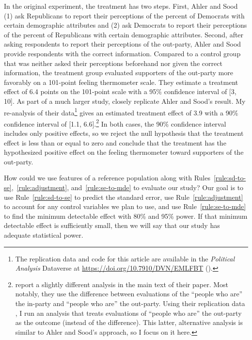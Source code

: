 \documentclass[12pt]{article}
\begin{document}
In the original experiment, the treatment has two steps.
First, Ahler and Sood (1) ask Republicans to report their perceptions of the percent of Democrats with certain demographic attributes and (2) ask Democrats to report their perceptions of the percent of Republicans with certain demographic attributes.
Second, after asking respondents to report their perceptions of the out-party, Ahler and Sood provide respondents with the correct information.
Compared to a control group that was neither asked their perceptions beforehand nor given the correct information, the treatment group evaluated supporters of the out-party more favorably on a 101-point feeling thermometer scale.
They estimate a treatment effect of 6.4 points on the 101-point scale with a 95\% confidence interval of [3, 10].
As part of a much larger study, \citet{Broockman2022} closely replicate Ahler and Sood's result. My re-analysis of their data\footnote{The replication data and code for this article are available in the \emph{Political Analysis} Dataverse at \url{https://doi.org/10.7910/DVN/EMLFBT} (\citealt{Rainey2026data}).} gives an estimated treatment effect of 3.9 with a 90\% confidence interval of [1.1, 6.6].\footnote{
  \citet{Broockman2022} report a slightly different analysis in the main text of their paper.
  Most notably, they use the difference between evaluations of the ``people who are'' the in-party and ``people who are'' the out-party.
  Using their replication data \citep{BKW2022data}, I run an analysis that treats evaluations of ``people who are'' the out-party as the outcome (instead of the difference).
  This latter, alternative analysis is similar to Ahler and Sood's approach, so I focus on it here.}
In both cases, the 90\% confidence interval includes only positive effects, so we reject the null hypothesis that the treatment effect is less than or equal to zero and conclude that the treatment has the hypothesized positive effect on the feeling thermometer toward supporters of the out-party.

How could we use features of a reference population along with Rules~\ref{rule:sd-to-se},~\ref{rule:adjustment}, and~\ref{rule:se-to-mde} to evaluate our study?
Our goal is to use Rule~\ref{rule:sd-to-se} to predict the standard error, use Rule~\ref{rule:adjustment} to account for any control variables we plan to use, and use Rule~\ref{rule:se-to-mde} to find the minimum detectable effect with 80\% and 95\% power.
If that minimum detectable effect is sufficiently small, then we will say that our study has adequate statistical power.
\end{document}
